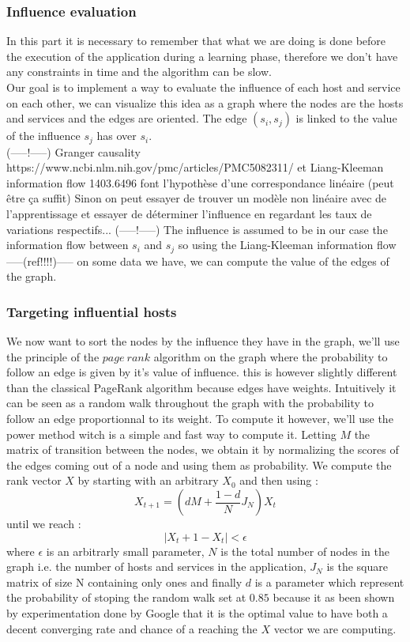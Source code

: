 \documentclass[10pt,a4paper,oneside]{article}
\begin{document}
\begin{multicols}{2}
\subsubsection{Influence evaluation}
In this part it is necessary to remember that what we are doing is done before the execution of the application during a learning phase, therefore we don't have any constraints in time and the algorithm can be slow.
\\
Our goal is to implement a way to evaluate the influence of each host and service on each other, we can visualize this idea as a graph where the nodes are the hosts and services and the edges are oriented. The edge $(s_i,s_j)$ is linked to the value of the influence $s_j$ has over $s_i$.
\\
(-----!-----)
Granger causality https://www.ncbi.nlm.nih.gov/pmc/articles/PMC5082311/ et Liang-Kleeman information flow 1403.6496 font l'hypothèse d'une correspondance linéaire (peut être ça suffit)
Sinon on peut essayer de trouver un modèle non linéaire avec de l'apprentissage et essayer de déterminer l'influence en regardant les taux de variations respectifs...
(-----!-----)
The influence is assumed to be in our case the information flow between $s_i$ and $s_j$ so using the Liang-Kleeman information flow -----(ref!!!!)----- on some data we have, we can compute the value of the edges of the graph.
\subsubsection{Targeting influential hosts}
We now want to sort the nodes by the influence they have in the graph, we'll use the principle of the $page~rank$ algorithm on the graph where the probability to follow an edge is given by it's value of influence. this is however slightly different than the classical PageRank algorithm because edges have weights. Intuitively it can be seen as a random walk throughout the graph with the probability to follow an edge proportionnal to its weight. To compute it however, we'll  use the power method witch is a simple and fast way to compute it. Letting $M$ the matrix of transition between the nodes, we obtain it by normalizing the scores of the edges coming out of a node and using them as probability. We compute the rank vector $X$ by starting with an arbitrary $X_0$ and then using :
	\[X_{t+1} = (dM + \frac{1-d}{N}J_N)X_t\]
until we reach :
	\[ \mid{X_t+1 - X_t}\mid < \epsilon\]
where $\epsilon$ is an arbitrarly small parameter, $N$ is the total number of nodes in the graph i.e. the number of hosts and services in the application, $J_N$ is the square matrix of size N containing only ones and finally $d$ is a parameter which represent the probability of stoping the random walk set at $0.85$ because it as been shown by experimentation done by Google that it is the optimal value to have both a decent converging rate and chance of a reaching the $X$ vector we are computing.
\end{multicols}
\end{document}
